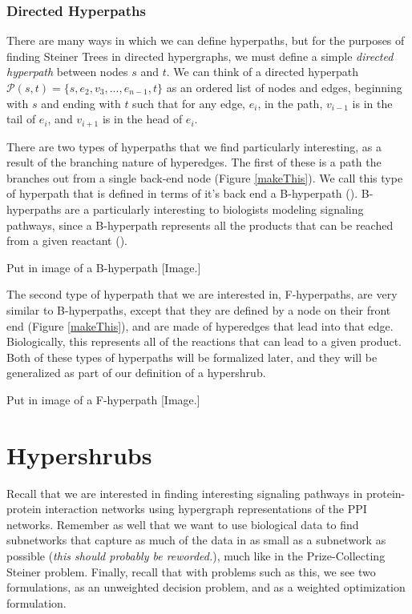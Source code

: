\documentclass[12pt,twoside]{reedthesis}
\newcommand{\new}[2]{{\color{red}#1 [#2]}}
\theoremstyle{definition}
\begin{document}
\subsection{Directed Hyperpaths}

There are many ways in which we can define hyperpaths, but for the purposes of finding Steiner Trees in directed hypergraphs, we must define a simple \textit{directed hyperpath} between nodes $s$ and $t$. We can think of a directed hyperpath $\mathcal{P}(s,t)=\{s,e_2,v_3,...,e_{n-1},t\}$ as an ordered list of nodes and edges, beginning with $s$ and ending with $t$ such that for any edge, $e_i$, in the path, $v_{i-1}$ is in the tail of $e_i$, and $v_{i+1}$ is in the head of $e_i$.\par

There are two types of hyperpaths that we find particularly interesting, as a result of the branching nature of hyperedges. The first of these is a path the branches out from a single back-end node (Figure \ref{makeThis}). We call this type of hyperpath that is defined in terms of it's back end a B-hyperpath (\cite{Gallo1993}). B-hyperpaths are a particularly interesting to biologists modeling signaling pathways, since a B-hyperpath represents all the products that can be reached from a given reactant (\cite{Ritz2014}).

\new{
Put in image of a B-hyperpath
}{Image.}

The second type of hyperpath that we are interested in, F-hyperpaths, are very similar to B-hyperpaths, except that they are defined by a node on their front end (Figure \ref{makeThis}), and are made of hyperedges that lead into that edge. Biologically, this represents all of the reactions that can lead to a given product. Both of these types of hyperpaths will be formalized later, and they will be generalized as part of our definition of a hypershrub.

\new{
Put in image of a F-hyperpath
}{Image.}

\chapter{Hypershrubs}

Recall that we are interested in finding interesting signaling pathways in protein-protein interaction networks using hypergraph representations of the PPI networks. Remember as well that we want to use biological data to find subnetworks that capture as much of the data in as small as a subnetwork as possible (\emph{this should probably be reworded.}), much like in the Prize-Collecting Steiner problem. Finally, recall that with problems such as this, we see two formulations, as an unweighted decision problem, and as a weighted optimization formulation.\par
\end{document}
